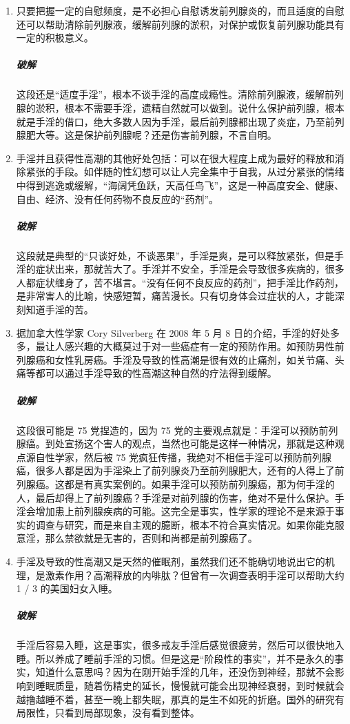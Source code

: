 \begin{enumerate}
    \item 只要把握一定的自慰频度，是不必担心自慰诱发前列腺炎的，而且适度的自慰还可以帮助清除前列腺液，缓解前列腺的淤积，对保护或恢复前列腺功能具有一定的积极意义。
    \subparagraph{破解} 这段还是“适度手淫”，根本不谈手淫的高度成瘾性。清除前列腺液，缓解前列腺的淤积，根本不需要手淫，遗精自然就可以做到。说什么保护前列腺，根本就是手淫的借口，绝大多数人因为手淫，最后前列腺都出现了炎症，乃至前列腺肥大等。这是保护前列腺呢？还是伤害前列腺，不言自明。
    \item 手淫并且获得性高潮的其他好处包括：可以在很大程度上成为最好的释放和消除紧张的手段。如伴随的性幻想可以让人完全集中于自我，从过分紧张的情绪中得到逃逸或缓解，“海阔凭鱼跃，天高任鸟飞”，这是一种高度安全、健康、自由、经济、没有任何药物不良反应的“药剂”。
    \subparagraph{破解} 这段就是典型的“只谈好处，不谈恶果”，手淫是爽，是可以释放紧张，但是手淫的症状出来，那就苦大了。手淫并不安全，手淫是会导致很多疾病的，很多人都症状缠身了，苦不堪言。“没有任何不良反应的药剂”，把手淫比作药剂，是非常害人的比喻，快感短暂，痛苦漫长。只有切身体会过症状的人，才能深刻知道手淫的苦。
    \item 据加拿大性学家 Cory Silverberg 在 2008 年 5 月 8 日的介绍，手淫的好处多多，最让人感兴趣的大概莫过于对一些癌症有一定的预防作用。如预防男性前列腺癌和女性乳房癌。手淫及导致的性高潮是很有效的止痛剂，如关节痛、头痛等都可以通过手淫导致的性高潮这种自然的疗法得到缓解。
    \subparagraph{破解} 这段很可能是 75 党捏造的，因为 75 党的主要观点就是：手淫可以预防前列腺癌。到处宣扬这个害人的观点，当然也可能是这样一种情况，那就是这种观点源自性学家，然后被 75 党疯狂传播，我绝对不相信手淫可以预防前列腺癌，很多人都是因为手淫染上了前列腺炎乃至前列腺肥大，还有的人得上了前列腺癌。这都是有真实案例的。如果手淫可以预防前列腺癌，那为何手淫的人，最后却得上了前列腺癌？手淫是对前列腺的伤害，绝对不是什么保护。手淫会增加患上前列腺疾病的可能。这完全是事实，性学家的理论不是来源于事实的调查与研究，而是来自主观的臆断，根本不符合真实情况。如果你能克服意淫，那么禁欲就是无害的，否则和尚都是前列腺癌了。
    \item 手淫及导致的性高潮又是天然的催眠剂，虽然我们还不能确切地说出它的机理，是激素作用？高潮释放的内啡肽？但曾有一次调查表明手淫可以帮助大约 1 / 3 的美国妇女入睡。
    \subparagraph{破解} 手淫后容易入睡，这是事实，很多戒友手淫后感觉很疲劳，然后可以很快地入睡。所以养成了睡前手淫的习惯。但是这是“阶段性的事实”，并不是永久的事实，知道什么意思吗？因为在刚开始手淫的几年，还没伤到神经，那就不会影响到睡眠质量，随着伤精史的延长，慢慢就可能会出现神经衰弱，到时候就会越撸越睡不着，甚至一晚上都失眠，那真的是生不如死的折磨。国外的研究有局限性，只看到局部现象，没有看到整体。

\end{enumerate}
